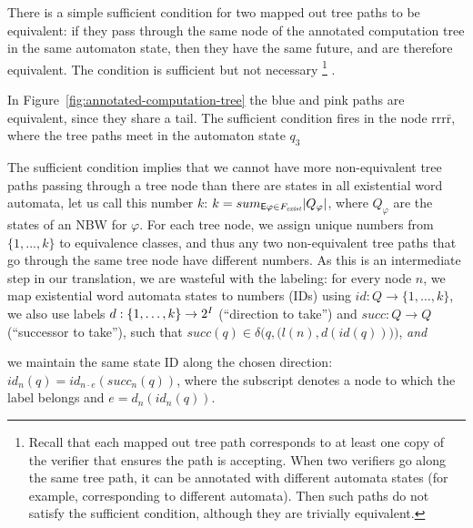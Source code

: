 There is a simple sufficient condition for two mapped out tree paths to be equivalent:
if they pass through the same node of the annotated computation tree in the same automaton state,
then they have the same future, and are therefore equivalent.
The condition is sufficient but not necessary%
\footnote{%
 Recall that each mapped out tree path corresponds to at least one copy of the verifier that ensures the path is accepting.
 When two verifiers go along the same tree path,
 it can be annotated with different automata states (for example, corresponding to different automata).
 Then such paths do not satisfy the sufficient condition, although they are trivially equivalent.}%
.

\begin{example}
In Figure~\ref{fig:annotated-computation-tree} the blue and pink paths are equivalent,
since they share a tail.
The sufficient condition fires in the node $\mathrm{rrr\bar r}$,
where the tree paths meet in the automaton state $q_3$
\end{example}

The sufficient condition implies that we cannot have more non-equivalent tree paths
passing through a tree node than there are states in all existential word automata,
let us call this number $k$:
$k = sum_{{\operatorname{\mathsf{E}}}\varphi \in F_\textit{exist}} |Q_\varphi|$,
where $Q_\varphi$ are the states of an NBW for $\varphi$.
For each tree node, we assign unique numbers from $\{1,...,k\}$ to equivalence classes,
and thus any two non-equivalent tree paths that go through the same tree node have different numbers.
As this is an intermediate step in our translation, we are wasteful with the labeling:
\li
\-[(1)] for every node $n$,
        we map existential word automata states to numbers (IDs) using
        $id: Q \to \{1,\ldots,k\}$,
        we also use labels
        $d:\{1,\ldots,k\}\to {2^I}$ (``direction to take'') and
        $succ: Q \to Q$ (``successor to take''),
        such that $succ(q) \in \delta\Big(q, \big(l(n),d(id(q))\big)\Big)$, \emph{and}

\-[(2)] we maintain the same state ID along the chosen direction:\\
        $id_n(q) = id_{n\cdot e}(succ_n(q))$,
        where the subscript denotes a node to which the label belongs
        and $e=d_n(id_n(q))$.
\il


